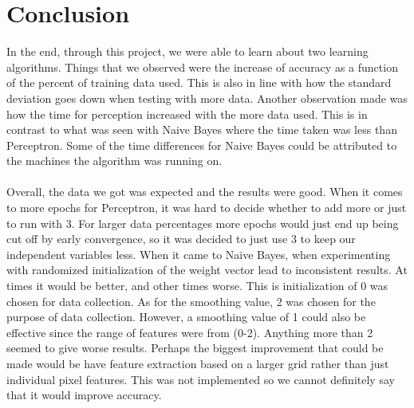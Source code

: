 \documentclass[titlepage]{article}
\begin{document}
\section{Conclusion}
In the end, through this project, we were able to learn about two learning algorithms. Things that we observed were the increase of accuracy as a function of the percent of training data used. This is also in line with how the standard deviation goes down when testing with more data. Another observation made was how the time for perception increased with the more data used. This is in contrast to what was seen with Naive Bayes where the time taken was less than Perceptron. Some of the time differences for Naive Bayes could be attributed to the machines the algorithm was running on.\\
\\
Overall, the data we got was expected and the results were good. When it comes to more epochs for Perceptron, it was hard to decide whether to add more or just to run with 3. For larger data percentages more epochs would just end up being cut off by early convergence, so it was decided to just use 3 to keep our independent variables less. When it came to Naive Bayes, when experimenting with randomized initialization of the weight vector lead to inconsistent results. At times it would be better, and other times worse. This is initialization of 0 was chosen for data collection. As for the smoothing value, 2 was chosen for the purpose of data collection. However, a smoothing value of 1 could also be effective since the range of features were from (0-2). Anything more than 2 seemed to give worse results. Perhaps the biggest improvement that could be made would be have feature extraction based on a larger grid rather than just individual pixel features. This was not implemented so we cannot definitely say that it would improve accuracy.
\end{document}
